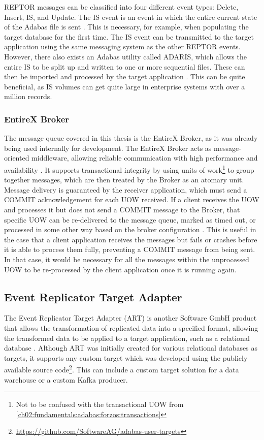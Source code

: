 \ac{REPTOR} messages can be classified into four different event types: Delete, Insert, \ac{IS}, and Update. The \ac{IS} event is an event in which the entire current state of the Adabas file is sent \cite{reptorprogrammersref}. This is necessary, for example, when populating the target database for the first time. The \ac{IS} event can be transmitted to the target application using the same messaging system as the other \ac{REPTOR} events. However, there also exists an Adabas utility called ADARIS, which allows the entire \ac{IS} to be split up and written to one or more sequential files. These can then be imported and processed by the target application \cite{reptorconcepts}. This can be quite beneficial, as \ac{IS} volumes can get quite large in enterprise systems with over a million records.

\subsubsection{EntireX Broker}
\label{ch02:fundamentals:adabas:entirex}
The message queue covered in this thesis is the EntireX Broker, as it was already being used internally for development. The EntireX Broker acts as message-oriented middleware, allowing reliable communication with high performance and availability \cite{entirexbrokerintro}. It supports transactional integrity by using units of work\footnote{Not to be confused with the transactional \ac{UOW} from \ref{ch02:fundamentals:adabas:forzos:transactions}} to group together messages, which are then treated by the Broker as an atomary unit. Message delivery is guaranteed by the receiver application, which must send a COMMIT acknowledgement for each \ac{UOW} received. If a client receives the \ac{UOW} and processes it but does not send a COMMIT message to the Broker, that specific \ac{UOW} can be re-delivered to the message queue, marked as timed out, or processed in some other way based on the broker configuration \cite{entirexbrokeradmin}. This is useful in the case that a client application receives the messages but fails or crashes before it is able to process them fully, preventing a COMMIT message from being sent. In that case, it would be necessary for all the messages within the unprocessed \ac{UOW} to be re-processed by the client application once it is running again.

\subsection{Event Replicator Target Adapter}
\label{ch02:fundamentals:adabas:art}
The Event Replicator Target Adapter (\ac{ART}) is another Software GmbH product that allows the transformation of replicated data into a specified format, allowing the transformed data to be applied to a target application, such as a relational database \cite{artconcepts}. Although \ac{ART} was initially created for various relational databases as targets, it supports any custom target which was developed using the publicly available source code\footnote{\url{https://github.com/SoftwareAG/adabas-user-targets}}. This can include a custom target solution for a data warehouse or a custom Kafka producer.

